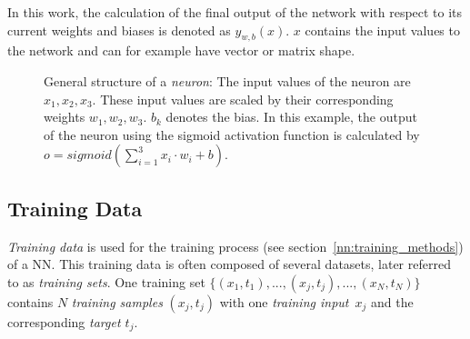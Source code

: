 In this work, the calculation of the final output of the network with respect to its current weights and biases is denoted as $y_{w,b}(x)$. $x$ contains the input values to the network and can for example have vector or matrix shape.



\begin{figure}
\centering
{}
\caption[Example structure neuron]{General structure of a \emph{neuron}: The input values of the neuron are $x_1, x_2, x_3$. These input values are scaled by their corresponding weights $w_1, w_2, w_3$. $b_k$ denotes the bias. 
In this example, the output of the neuron using the sigmoid activation function is calculated by~$o={sigmoid\left(\sum_{i=1}^3 x_i \cdot w_i + b\right)}$.}
\label{draw:neuron}
\end{figure}

\subsection{Training Data}
\label{nn:training_data}
\emph{Training data} is used for the training process (see section~\ref{nn:training_methods}) of a NN. This training data is often composed of several datasets, later referred to as \emph{training sets}. One training set $\{(x_1,t_1),...,(x_j,t_j),...,(x_N,t_N)\}$ contains $N$ \emph{training samples} $(x_j,t_j)$ with one \emph{training input}~$x_j$ and the corresponding \emph{target $t_j$}.

